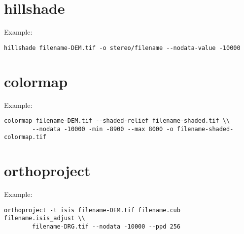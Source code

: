 \section{hillshade}
\label{hillshade}

Example:
\begin{verbatim}
hillshade filename-DEM.tif -o stereo/filename --nodata-value -10000
\end{verbatim}

\section{colormap}
\label{colormap}

Example:
\begin{verbatim}
colormap filename-DEM.tif --shaded-relief filename-shaded.tif \\
        --nodata -10000 -min -8900 --max 8000 -o filename-shaded-colormap.tif
\end{verbatim}

\section{orthoproject}
\label{orthoproject}

Example:
\begin{verbatim}
orthoproject -t isis filename-DEM.tif filename.cub filename.isis_adjust \\
        filename-DRG.tif --nodata -10000 --ppd 256
\end{verbatim}
